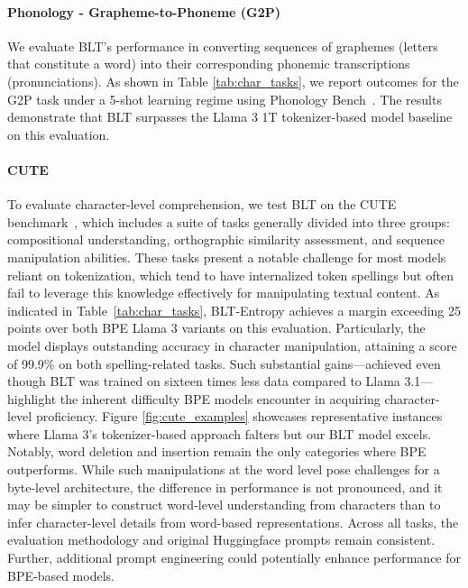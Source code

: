 \paragraph{Phonology - Grapheme-to-Phoneme (G2P)} We evaluate {\textsc BLT}'s performance in converting sequences of graphemes (letters that constitute a word) into their corresponding phonemic transcriptions (pronunciations). As shown in Table \ref{tab:char_tasks}, we report outcomes for the G2P task under a 5-shot learning regime using Phonology Bench~\citep{suvarna2024phonologybench}. The results demonstrate that {\textsc BLT} surpasses the Llama 3 1T tokenizer-based model baseline on this evaluation.

\paragraph{CUTE}
To evaluate character-level comprehension, we test {\textsc BLT} on the CUTE benchmark~\citep{edman2024cute}, which includes a suite of tasks generally divided into three groups: compositional understanding, orthographic similarity assessment, and sequence manipulation abilities. These tasks present a notable challenge for most models reliant on tokenization, which tend to have internalized token spellings but often fail to leverage this knowledge effectively for manipulating textual content. As indicated in Table~\ref{tab:char_tasks}, {\textsc BLT}-Entropy achieves a margin exceeding 25 points over both BPE Llama 3 variants on this evaluation. Particularly, the model displays outstanding accuracy in character manipulation, attaining a score of 99.9\% on both spelling-related tasks. Such substantial gains—achieved even though {\textsc BLT} was trained on sixteen times less data compared to Llama 3.1—highlight the inherent difficulty BPE models encounter in acquiring character-level proficiency. Figure \ref{fig:cute_examples} showcases representative instances where Llama 3's tokenizer-based approach falters but our {\textsc BLT} model excels. Notably, word deletion and insertion remain the only categories where BPE outperforms. While such manipulations at the word level pose challenges for a byte-level architecture, the difference in performance is not pronounced, and it may be simpler to construct word-level understanding from characters than to infer character-level details from word-based representations. Across all tasks, the evaluation methodology and original Huggingface prompts remain consistent. Further, additional prompt engineering could potentially enhance performance for BPE-based models.

